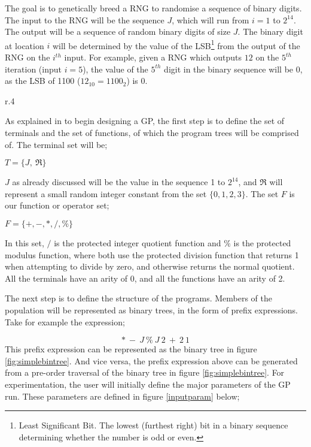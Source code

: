 \documentclass[a4paper,10.5pt]{article}
\begin{document}
The goal is to genetically breed a RNG to randomise a sequence of binary digits. The input to the RNG will be the sequence $J$, which will run from $i = 1$ to $2^{14}$. The output will be a sequence of random binary digits of size $J$. The binary digit at location $i$ will be determined by the value of the LSB\footnote{Least Significant Bit. The lowest (furthest right) bit in a binary sequence determining whether the number is odd or even.} from the output of the RNG on the $i^{th}$ input. For example, given a RNG which outputs $12$ on the $5^{th}$ iteration (input $i = 5$), the value of the $5^{th}$ digit in the binary sequence will be $0$, as the LSB of 1100 ($12_{10} = 1100_2$) is 0. 

\begin{wrapfigure}{r}{.4\textwidth}
\caption{RNG binary tree}
\label{fig:simplebintree}
\end{wrapfigure}

As explained in \cite[p.19-27]{introgp} to begin designing a GP, the first step is to define the set of terminals and the set of functions, of which the program trees will be comprised of. The terminal set will be; \begin{center}$T = \{J,\ \Re\}$\end{center} $J$ as already discussed will be the value in the sequence 1 to $2^{14}$, and $\Re$ will represent a small random integer constant from the set $\{0, 1, 2, 3\}$. The set $F$ is our function or operator set; \begin{center}$F = \{+, -, *, /, \%\}$\end{center}In this set, $/$ is the protected integer quotient function and $\%$ is the protected modulus function, where both use the protected division function that returns 1 when attempting to divide by zero, and otherwise returns the normal quotient. All the terminals have an arity of 0, and all the functions have an arity of 2.

\begin{text}The next step is to define the structure of the programs. Members of the population will be represented as binary trees, in the form of prefix expressions. Take for example the expression; \end{text}
\begin{equation*}*\ -\ J\ \%\ J\ 2\ +\ 2\ 1 \end{equation*} 
This prefix expression can be represented as the binary tree in figure \ref{fig:simplebintree}. And vice versa, the prefix expression above can be generated from a pre-order traversal of the binary tree in figure \ref{fig:simplebintree}. For experimentation, the user will initially define the major parameters of the GP run. These parameters are defined in figure \ref{inputparam} below;
\end{document}

